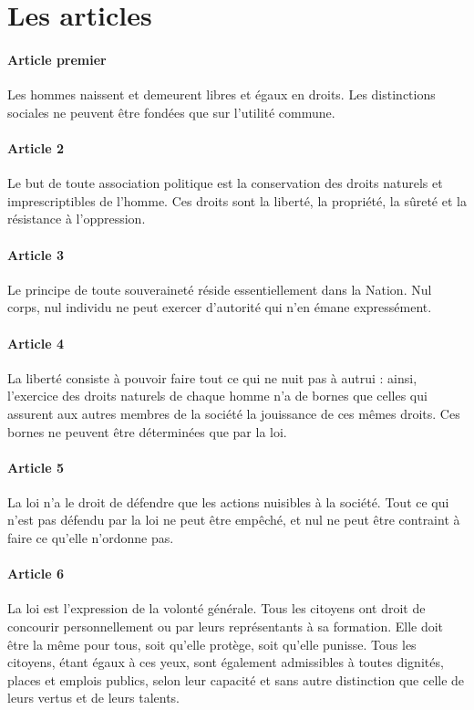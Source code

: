 \documentclass{book}
\begin{document}
\section{Les articles}
\paragraph{Article premier}
Les hommes naissent et demeurent libres et égaux en droits. Les distinctions sociales ne peuvent être fondées que sur l'utilité commune.
\paragraph{Article 2}
Le but de toute association politique est la conservation des droits naturels et imprescriptibles de l'homme. Ces droits sont la liberté, la propriété, la sûreté et la résistance à l'oppression.
\paragraph{Article 3}
Le principe de toute souveraineté réside essentiellement dans la Nation. Nul corps, nul individu ne peut exercer d'autorité qui n'en émane expressément.
\paragraph{Article 4}
La liberté consiste à pouvoir faire tout ce qui ne nuit pas à autrui : ainsi, l'exercice des droits naturels de chaque homme n'a de bornes que celles qui assurent aux autres membres de la société la jouissance de ces mêmes droits. Ces bornes ne peuvent être déterminées que par la loi.
\paragraph{Article 5}
La loi n'a le droit de défendre que les actions nuisibles à la société. Tout ce qui n'est pas défendu par la loi ne peut être empêché, et nul ne peut être contraint à faire ce qu'elle n'ordonne pas.
\paragraph{Article 6}
La loi est l'expression de la volonté générale. Tous les citoyens ont droit de concourir personnellement ou par leurs représentants à sa formation. Elle doit être la même pour tous, soit qu'elle protège, soit qu'elle punisse. Tous les citoyens, étant égaux à ces yeux, sont également admissibles à toutes dignités, places et emplois publics, selon leur capacité et sans autre distinction que celle de leurs vertus et de leurs talents.
\end{document}
